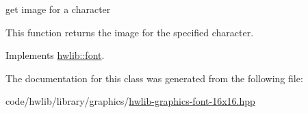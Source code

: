 get image for a character 

This function returns the image for the specified character. 

Implements \hyperlink{classhwlib_1_1font_a723595f70f1e042db23d3140b1d4cad8}{hwlib\+::font}.



The documentation for this class was generated from the following file\+:\begin{DoxyCompactItemize}
\item 
code/hwlib/library/graphics/\hyperlink{hwlib-graphics-font-16x16_8hpp}{hwlib-\/graphics-\/font-\/16x16.\+hpp}\end{DoxyCompactItemize}
